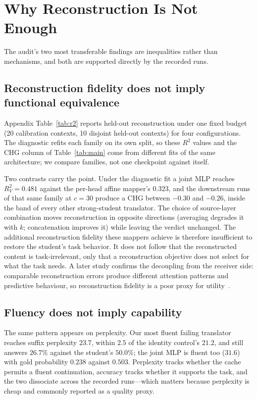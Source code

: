 \documentclass{article} %
\begin{document}
\section{Why Reconstruction Is Not Enough}
\label{sec:analysis}

The audit's two most transferable findings are inequalities rather than
mechanisms, and both are supported directly by the recorded runs.

\subsection{Reconstruction fidelity does not imply functional equivalence}
Appendix Table~\ref{tab:r2} reports held-out reconstruction under one fixed
budget (20 calibration contexts, 10 disjoint held-out contexts) for four
configurations. The diagnostic refits each family on its own split, so these
$R^2$ values and the CHG column of Table~\ref{tab:main} come from different fits
of the same architecture; we compare families, not one checkpoint against
itself.

Two contrasts carry the point. Under the diagnostic fit a joint MLP reaches
$R^2_V = 0.481$ against the per-head affine mapper's $0.323$, and the downstream
runs of that same family at $c{=}30$ produce a CHG between $-0.30$ and $-0.26$,
inside the band of every other strong-student translator. The choice of
source-layer combination moves reconstruction in opposite directions (averaging
degrades it with $k$; concatenation improves it) while leaving the verdict
unchanged. The additional reconstruction fidelity these mappers achieve is
therefore insufficient to restore the student's task behavior. It does not
follow that the reconstructed content is task-irrelevant, only that a
reconstruction objective does not select for what the task needs. A later study
confirms the
decoupling from the receiver side: comparable reconstruction errors produce
different attention patterns and predictive behaviour, so reconstruction
fidelity is a poor proxy for utility~\citep{cachelink2026}.

\subsection{Fluency does not imply capability}
The same pattern appears on perplexity. Our most fluent failing translator
reaches suffix perplexity $23.7$, within $2.5$ of the identity control's $21.2$,
and still answers $26.7\%$ against the student's $50.0\%$; the joint MLP is
fluent too ($31.6$) with gold probability $0.238$ against $0.503$. Perplexity
tracks whether the cache permits a fluent continuation, accuracy tracks whether
it supports the task, and the two dissociate across the recorded runs---which
matters because perplexity is cheap and commonly reported as a quality proxy.
\end{document}
